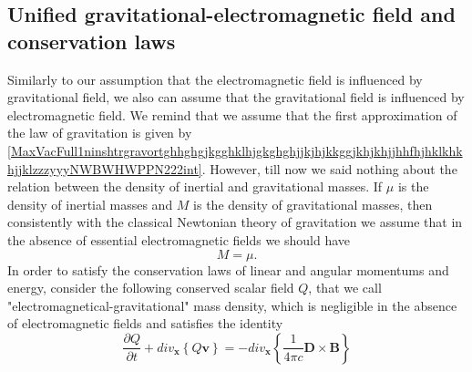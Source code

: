 \documentclass{article}
\theoremstyle{definition}
\theoremstyle{remark}
\renewcommand{\vec}[1]{\mathbf{#1}}
\newcommand{\er}{\eqref}
\newcommand{\er}{\eqref}
\begin{document}
\subsection{Unified gravitational-electromagnetic field and conservation laws}
Similarly to our assumption that the electromagnetic field is
influenced by gravitational field, we also can assume that the
gravitational field is influenced by electromagnetic field. We
remind that we assume that the first approximation of the law of
gravitation is given by
\er{MaxVacFull1ninshtrgravortghhghgjkgghklhjgkghghjjkjhjkkggjkhjkhjjhhfhjhklkhkhjjklzzzyyyNWBWHWPPN222int}.
However, till now we said nothing about the relation between the
density of inertial and gravitational masses. If $\mu$ is the
density of inertial masses and $M$ is the density of gravitational
masses, then consistently with the classical Newtonian theory of
gravitation we assume that in the absence of essential
electromagnetic fields we should have
\begin{equation}\label{gghjgghfghdint}
M=\mu.
\end{equation}
In order to satisfy the conservation laws of linear and angular
momentums and energy, consider the following conserved scalar field
$Q$, that we call "electromagnetical-gravitational" mass density,
which is negligible in the absence of electromagnetic fields and
satisfies the identity
\begin{equation}
\label{MaxVacFull1ninshtrgravortghhghgjkgghklhjgkghghjjkjhjkkggjkhjkhjjhhfhjhklkhkhjjklzzzyyyNWNWBWHWPPNint}
\frac{\partial Q}{\partial t}+div_{\vec x}\left\{Q\vec v\right\}=-
div_\vec x\left\{\frac{1}{4\pi c}\vec D\times \vec B\right\}
\end{equation}
\end{document}
